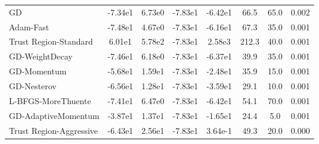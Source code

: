 \documentclass{article}
\begin{document}
\begin{table}[htbp]
{\begin{tabular}{p{2.5cm}*{7}{c}}
GD & -7.34e1 & 6.73e0 & -7.83e1 & -6.42e1 & 66.5 & 65.0 & 0.002 \\
Adam-Fast & -7.48e1 & 4.67e0 & -7.83e1 & -6.16e1 & 67.3 & 35.0 & 0.001 \\
Trust Region-Standard & 6.01e1 & 5.78e2 & -7.83e1 & 2.58e3 & 212.3 & 40.0 & 0.001 \\
GD-WeightDecay & -7.46e1 & 6.18e0 & -7.83e1 & -6.37e1 & 39.9 & 35.0 & 0.001 \\
GD-Momentum & -5.68e1 & 1.59e1 & -7.83e1 & -2.48e1 & 35.9 & 15.0 & 0.001 \\
GD-Nesterov & -6.56e1 & 1.28e1 & -7.83e1 & -3.59e1 & 29.1 & 10.0 & 0.001 \\
L-BFGS-MoreThuente & -7.41e1 & 6.47e0 & -7.83e1 & -6.42e1 & 54.1 & 70.0 & 0.001 \\
GD-AdaptiveMomentum & -3.87e1 & 1.37e1 & -7.83e1 & -1.65e1 & 24.4 & 5.0 & 0.001 \\
Trust Region-Aggressive & -6.43e1 & 2.56e1 & -7.83e1 & 3.64e-1 & 49.3 & 20.0 & 0.000 \\
\bottomrule
\end{tabular}
}
\end{table}
\end{document}
